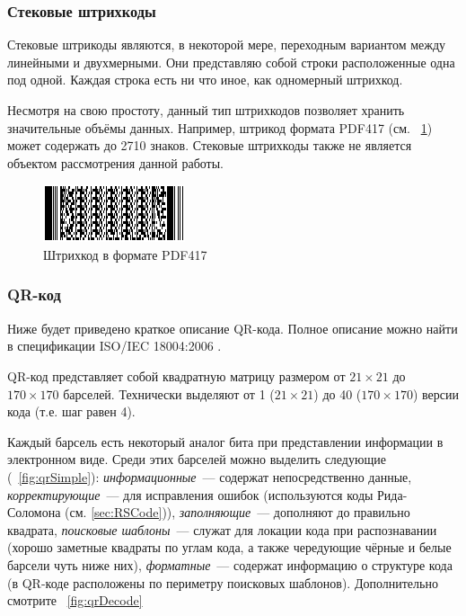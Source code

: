 \subsubsection{Стековые штрихкоды}  
Стековые штрикоды являются, в некоторой мере, переходным вариантом
между линейными и двухмерными. Они представляю собой строки расположенные
одна под одной. Каждая строка есть ни что иное, как одномерный штрихкод.

Несмотря на свою простоту, данный тип штрихкодов позволяет хранить 
значительные объёмы данных. Например, штрикод формата PDF417 
(см. \figurename\ \ref{fig:pdf417}) может содержать до 2710 знаков.
Стековые штрихкоды также не является объектом рассмотрения данной
работы. 

\begin{figure}[htb]
    \centering
    \includegraphics{img/pdf417_sample}
    \caption{Штрихкод в формате PDF417}
    \label{fig:pdf417}
\end{figure}

\subsubsection{QR-код}
Ниже будет приведено краткое описание QR-кода. Полное описание можно найти в
спецификации ISO/IEC 18004:2006 \cite{bib:isoQR}.  

QR-код представляет собой квадратную матрицу размером от $21 \times 21$ до 
$170 \times 170$ барселей. Технически выделяют от 1 ($21 \times 21$) до
40 ($170 \times 170$) версии кода (т.е. шаг равен 4).

Каждый барсель есть некоторый 
аналог бита при представлении информации в электронном виде. Среди этих
барселей можно выделить следующие (\figurename\ \ref{fig:qrSimple}): 
\textit{информационные}~--- содержат 
непосредственно данные, \textit{корректирующие}~--- для исправления ошибок
(используются коды Рида-Соломона (см. \ref{sec:RSCode})), 
\textit{заполняющие}~---
дополняют до правильно квадрата, \textit{поисковые шаблоны}~--- 
служат для локации кода при распознавании (хорошо заметные квадраты по 
углам кода, а также чередующие чёрные и белые барсели чуть ниже них), 
\textit{форматные}~--- содержат информацию о структуре кода (в QR-коде 
расположены по периметру поисковых шаблонов). Дополнительно смотрите 
\figurename\ \ref{fig:qrDecode}

